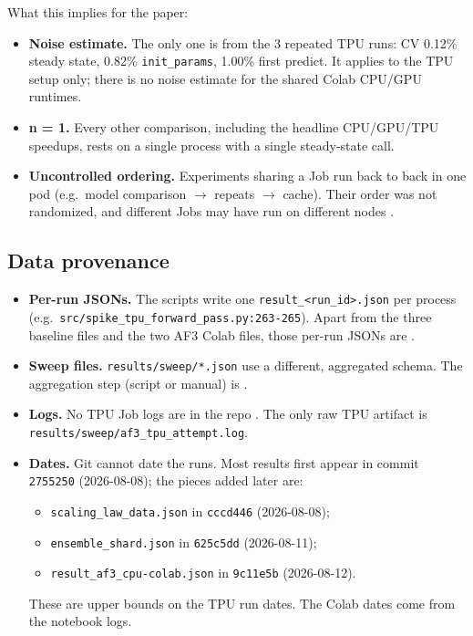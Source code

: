 What this implies for the paper:
\begin{itemize}
  \item \textbf{Noise estimate.} The only one is from the 3 repeated TPU runs: CV 0.12\%
    steady state, 0.82\% \texttt{init\_params}, 1.00\% first predict. It applies to the TPU
    setup only; there is no noise estimate for the shared Colab CPU/GPU runtimes.
  \item \textbf{n = 1.} Every other comparison, including the headline CPU/GPU/TPU
    speedups, rests on a single process with a single steady-state call.
  \item \textbf{Uncontrolled ordering.} Experiments sharing a Job run back to back in one
    pod (e.g.\ model comparison $\rightarrow$ repeats $\rightarrow$ cache). Their order was not randomized,
    and different Jobs may have run on different nodes .
\end{itemize}

\subsection{Data provenance}
\label{sec:meth-provenance}

\begin{itemize}
  \item \textbf{Per-run JSONs.} The scripts write one \texttt{result\_\textless{}run\_id\textgreater{}.json} per process
    (e.g.\ \texttt{src/\allowbreak{}spike\_\allowbreak{}tpu\_\allowbreak{}forward\_\allowbreak{}pass.py:263-265}). Apart from the three baseline
    files and the two AF3 Colab files, those per-run JSONs are .
  \item \textbf{Sweep files.} \texttt{results/sweep/*.json} use a different, aggregated schema.
    The aggregation step (script or manual) is .
  \item \textbf{Logs.} No TPU Job logs are in the repo . The only raw TPU
    artifact is \texttt{results/\allowbreak{}sweep/\allowbreak{}af3\_\allowbreak{}tpu\_\allowbreak{}attempt.log}.
  \item \textbf{Dates.} Git cannot date the runs. Most results first appear in commit
    \texttt{2755250} (2026-08-08); the pieces added later are:
    \begin{itemize}
      \item \texttt{scaling\_\allowbreak{}law\_\allowbreak{}data.json} in \texttt{cccd446} (2026-08-08);
      \item \texttt{ensemble\_shard.json} in \texttt{625c5dd} (2026-08-11);
      \item \texttt{result\_\allowbreak{}af3\_\allowbreak{}cpu-colab.json} in \texttt{9c11e5b} (2026-08-12).
    \end{itemize}
    These are upper bounds on the TPU run dates. The Colab dates come from the
    notebook logs.
\end{itemize}

